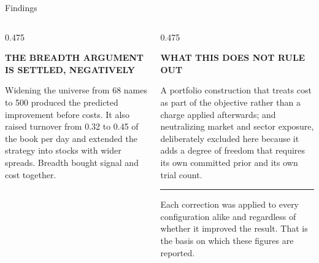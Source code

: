 \documentclass[aspectratio=169,10pt]{beamer}
\makeatletter
\newcommand{\eyebrow}[1]{\def\@eyebrow{#1}}
\newcommand{\aside}[1]{{\setlength{\leftskip}{3mm}\sffamily\fontsize{7.4}{10}\selectfont
  \color{muted}\hspace*{-3mm}\rule[-0.6mm]{0.5pt}{3.4mm}\hspace{2mm}#1\par}}
\newcommand{\bodytext}[1]{{\sffamily\fontsize{7.4}{9.7}\selectfont\color{ink2}#1\par}}
\newcommand{\subhead}[1]{{\sffamily\fontsize{6.6}{9}\selectfont\bfseries\color{ink2}%
  \MakeUppercase{#1}\par\vskip0.6mm}}
\makeatother
\begin{document}
\eyebrow{Findings}
\begin{frame}[t]{Findings}
\begin{columns}[T]\begin{column}{0.475\textwidth}\subhead{The breadth argument is settled, negatively}
\bodytext{Widening the universe from 68 names to 500 produced the predicted improvement before costs. It also raised turnover from 0.32 to 0.45 of the book per day and extended the strategy into stocks with wider spreads. Breadth bought signal and cost together.}
\vskip0.8mm\end{column}\begin{column}{0.475\textwidth}\subhead{What this does not rule out}
\bodytext{A portfolio construction that treats cost as part of the objective rather than a charge applied afterwards; and neutralizing market and sector exposure, deliberately excluded here because it adds a degree of freedom that requires its own committed prior and its own trial count.}
\vskip0.8mm
\aside{Each correction was applied to every configuration alike and regardless of whether it improved the result. That is the basis on which these figures are reported.}
\vskip0.8mm\end{column}\end{columns}
\end{frame}
\end{document}
